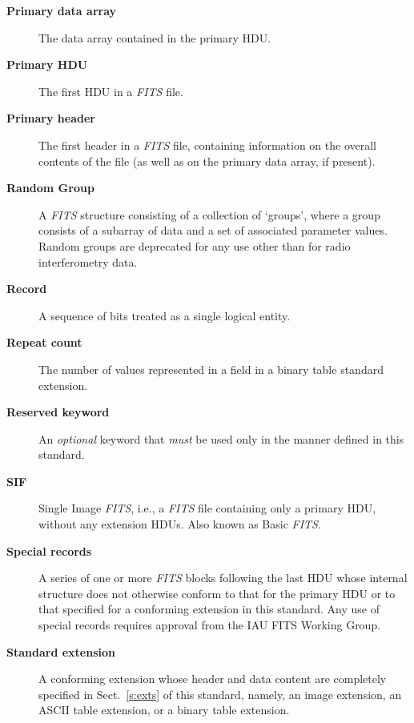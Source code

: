 \documentclass[onecolumn]{aa}
\begin{document}
\begin{description}
\item[\bf Primary data array] The
   data array contained in the primary HDU.
\item[\bf Primary HDU] The first HDU in a {\em FITS\/} file.
\item[\bf Primary header] The first header 
   in a {\em FITS\/} file, containing information on the 
   overall contents of the file (as well as on the
   primary data array, if present).
\item[\bf Random Group] A {\em FITS\/} structure consisting of a collection
of `groups', where a group consists of a subarray of data and a
set of associated parameter values.  Random groups are deprecated for
any use other than for radio interferometry data.
\item[\bf Record] A sequence of bits treated as a single logical entity.

\item[\bf Repeat count] The number of values 
    represented in a field in a binary table standard extension.
\item[\bf Reserved keyword] An {\em optional} keyword 
   that {\em must} be used only in the manner defined in this standard.
\item[\bf SIF] Single Image {\em FITS\/}, i.e., a {\em FITS\/} file containing only a primary
    HDU, without any extension HDUs.  Also known as Basic {\em FITS\/}.
\item[\bf Special records] A series of one or more {\em FITS\/} blocks 
   following the last HDU 
   whose internal structure does not otherwise conform to that for
   the primary HDU or to that specified for a conforming 
   extension in
   this standard.  Any use of special records requires approval from
   the IAU FITS Working Group.
\item[\bf Standard extension] A
     conforming 
     extension 
   whose header and data 
   content are completely specified in Sect.\ \ref{s:exts} of this standard, namely,
   an image extension, an ASCII table extension, or a binary table extension.
\end{description}

\end{document}
